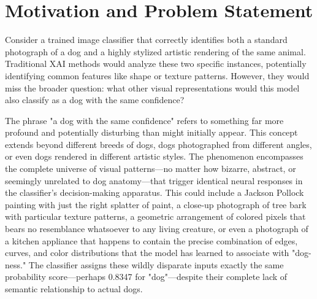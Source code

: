 \documentclass[licencjacka,en]{pracamgr}
\begin{document}
\section{Motivation and Problem Statement}

Consider a trained image classifier that correctly identifies both a standard photograph of a dog and a highly stylized artistic rendering of the same animal. Traditional XAI methods would analyze these two specific instances, potentially identifying common features like shape or texture patterns. However, they would miss the broader question: what other visual representations would this model also classify as a dog with the same confidence?

The phrase "a dog with the same confidence" refers to something far more profound and potentially disturbing than might initially appear. This concept extends beyond different breeds of dogs, dogs photographed from different angles, or even dogs rendered in different artistic styles. The phenomenon encompasses the complete universe of visual patterns—no matter how bizarre, abstract, or seemingly unrelated to dog anatomy—that trigger identical neural responses in the classifier's decision-making apparatus. This could include a Jackson Pollock painting with just the right splatter of paint, a close-up photograph of tree bark with particular texture patterns, a geometric arrangement of colored pixels that bears no resemblance whatsoever to any living creature, or even a photograph of a kitchen appliance that happens to contain the precise combination of edges, curves, and color distributions that the model has learned to associate with "dog-ness." The classifier assigns these wildly disparate inputs exactly the same probability score—perhaps 0.8347 for "dog"—despite their complete lack of semantic relationship to actual dogs.
\end{document}
